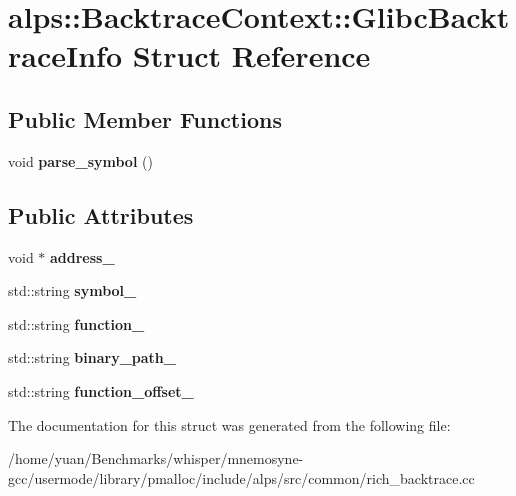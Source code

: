 \hypertarget{structalps_1_1BacktraceContext_1_1GlibcBacktraceInfo}{}\section{alps\+:\+:Backtrace\+Context\+:\+:Glibc\+Backtrace\+Info Struct Reference}
\label{structalps_1_1BacktraceContext_1_1GlibcBacktraceInfo}
\subsection*{Public Member Functions}
\begin{DoxyCompactItemize}
\item 
void {\bfseries parse\+\_\+symbol} ()\hypertarget{structalps_1_1BacktraceContext_1_1GlibcBacktraceInfo_afc695a15f5962be42cf304b9f73ee3c4}{}\label{structalps_1_1BacktraceContext_1_1GlibcBacktraceInfo_afc695a15f5962be42cf304b9f73ee3c4}

\end{DoxyCompactItemize}
\subsection*{Public Attributes}
\begin{DoxyCompactItemize}
\item 
void $\ast$ {\bfseries address\+\_\+}\hypertarget{structalps_1_1BacktraceContext_1_1GlibcBacktraceInfo_a765de28b010b51e4bfc0f92bdae909b2}{}\label{structalps_1_1BacktraceContext_1_1GlibcBacktraceInfo_a765de28b010b51e4bfc0f92bdae909b2}

\item 
std\+::string {\bfseries symbol\+\_\+}\hypertarget{structalps_1_1BacktraceContext_1_1GlibcBacktraceInfo_a044ebca4718034acfb8b3b75cd1d2ef6}{}\label{structalps_1_1BacktraceContext_1_1GlibcBacktraceInfo_a044ebca4718034acfb8b3b75cd1d2ef6}

\item 
std\+::string {\bfseries function\+\_\+}\hypertarget{structalps_1_1BacktraceContext_1_1GlibcBacktraceInfo_a452ff6b6d870f25dc1321f714205f1d7}{}\label{structalps_1_1BacktraceContext_1_1GlibcBacktraceInfo_a452ff6b6d870f25dc1321f714205f1d7}

\item 
std\+::string {\bfseries binary\+\_\+path\+\_\+}\hypertarget{structalps_1_1BacktraceContext_1_1GlibcBacktraceInfo_a50ca1a23d69ee5e2d90f4cce26255bb7}{}\label{structalps_1_1BacktraceContext_1_1GlibcBacktraceInfo_a50ca1a23d69ee5e2d90f4cce26255bb7}

\item 
std\+::string {\bfseries function\+\_\+offset\+\_\+}\hypertarget{structalps_1_1BacktraceContext_1_1GlibcBacktraceInfo_a97f160117376d552e4c5d4f3c4da0780}{}\label{structalps_1_1BacktraceContext_1_1GlibcBacktraceInfo_a97f160117376d552e4c5d4f3c4da0780}

\end{DoxyCompactItemize}


The documentation for this struct was generated from the following file\+:\begin{DoxyCompactItemize}
\item 
/home/yuan/\+Benchmarks/whisper/mnemosyne-\/gcc/usermode/library/pmalloc/include/alps/src/common/rich\+\_\+backtrace.\+cc\end{DoxyCompactItemize}
